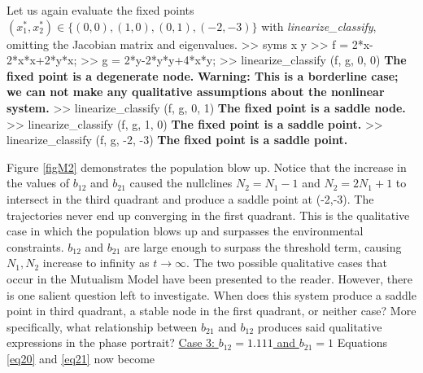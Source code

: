 \documentclass[11pt,a4paper]{scrartcl}
\theoremstyle{definition}
\begin{document}
Let us again evaluate the fixed points $(x_1^{*}, x_2^{*}) \in \Big\{(0,0), (1,0), (0,1), (-2,-3) \Big\}$ with \newline\textit{linearize\_classify}, omitting the Jacobian matrix and eigenvalues.
\newline
>> syms x y\newline
>> f = 2*x-2*x*x+2*y*x;\newline
>> g = 2*y-2*y*y+4*x*y;\newline
>> linearize\_classify (f, g, 0, 0)\newline
\textbf{The fixed point is a degenerate node.}\newline
\textbf{Warning: This is a borderline case; we can not make any qualitative assumptions about the nonlinear system.}\newline
>> linearize\_classify (f, g, 0, 1)\newline
\textbf{The fixed point is a saddle node.}\newline
>> linearize\_classify (f, g, 1, 0)\newline
\textbf{The fixed point is a saddle point.}\newline
>> linearize\_classify (f, g, -2, -3)\newline
\textbf{The fixed point is a saddle point.}\newline

Figure \ref{figM2} demonstrates the population blow up. Notice that the increase in the values of $b_{12}$ and $b_{21}$ caused the nullclines $N_2=N_1-1$ and $N_2=2N_1+1$ to intersect in the third quadrant and produce a saddle point at (-2,-3). The trajectories never end up converging in the first quadrant. This is the qualitative case in which the population blows up and surpasses the environmental constraints. $b_{12}$ and $b_{21}$ are large enough to surpass the threshold term, causing $N_1,N_2$ increase to infinity as $t \rightarrow \infty$.\newline\newline
The two possible qualitative cases that occur in the Mutualism Model have been presented to the reader. However, there is one salient question left to investigate. When does this system produce a saddle point in third quadrant, a stable node in the first quadrant, or neither case? More specifically, what relationship between $b_{21}$ and $b_{12}$ produces said qualitative expressions in the phase portrait?
\newline\newline
\underline{Case 3: $b_{12} = 1.111$ and $b_{21} = 1$}
\newline\newline
Equations \eqref{eq20} and \eqref{eq21} now become 
\end{document}
